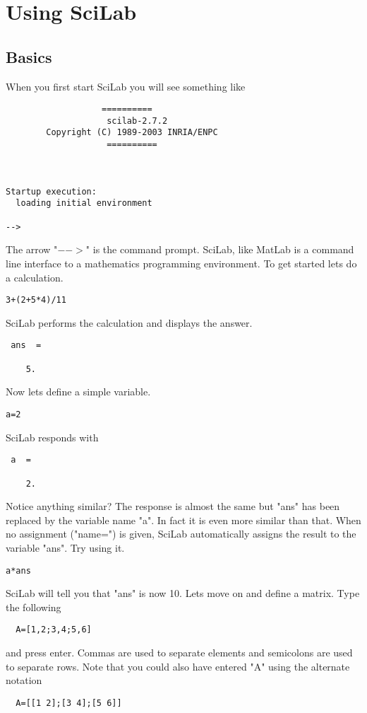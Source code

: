 \chapter{Using SciLab}

\section{Basics}
When you first start SciLab you will see something like
\begin{verbatim}
                   ==========
                    scilab-2.7.2
        Copyright (C) 1989-2003 INRIA/ENPC
                    ==========



Startup execution:
  loading initial environment

-->
\end{verbatim}
The arrow "$-$$-$$>$" is the command prompt.  SciLab, like MatLab is a command line interface to a mathematics programming environment.  To get started lets do a calculation.
\begin{verbatim}
3+(2+5*4)/11
\end{verbatim}
SciLab performs the calculation and displays the answer.
\begin{verbatim}
 ans  =

    5.
\end{verbatim}
Now lets define a simple variable.
\begin{verbatim}
a=2
\end{verbatim}
SciLab responds with
\begin{verbatim}
 a  =

    2.
\end{verbatim}
Notice anything similar?  The response is almost the same but "ans" has been replaced by the variable name "a".  In fact it is even more similar than that.  When no assignment ("name=") is given, SciLab automatically assigns the result to the variable "ans".  Try using it.
\begin{verbatim}
a*ans
\end{verbatim}
SciLab will tell you that "ans" is now 10.  Lets move on and define a matrix.  Type the following
\begin{verbatim}
  A=[1,2;3,4;5,6]
\end{verbatim}
and press enter. Commas are used to separate elements and semicolons are used to separate rows.  Note that you could also have entered "A" using the alternate notation
\begin{verbatim}
  A=[[1 2];[3 4];[5 6]]
\end{verbatim}
